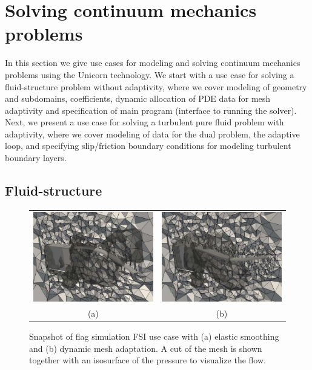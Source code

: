\section{Solving continuum mechanics problems}

In this section we give use cases for modeling and solving continuum
mechanics problems using the Unicorn technology. We start with a use
case for solving a fluid-structure problem without adaptivity, where
we cover modeling of geometry and subdomains, coefficients, dynamic
allocation of PDE data for mesh adaptivity and specification of main
program (interface to running the solver). Next, we present a use case
for solving a turbulent pure fluid problem with adaptivity, where we
cover modeling of data for the dual problem, the adaptive loop, and
specifying slip/friction boundary conditions for modeling turbulent
boundary layers.


\subsection{Fluid-structure}

\begin{figure}[!ht]
\begin{center}
\begin{tabular}{cc}
\includegraphics[width=0.5\linewidth]{chapters/hoffman-2/eps/flag_smooth05.eps} &
\includegraphics[width=0.5\linewidth]{chapters/hoffman-2/eps/flag_hybrid05.eps}\\
(a) & (b)
\end{tabular}
\end{center}
\caption{Snapshot of flag simulation FSI use case with (a) elastic smoothing and
  (b) dynamic mesh adaptation. A cut of the mesh is shown together with an
  isosurface of the pressure to visualize the flow.}
\label{fig:flag_snapshot}
\end{figure}

